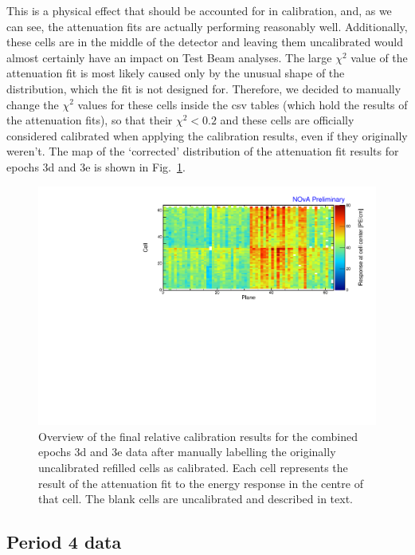 This is a physical effect that should be accounted for in calibration, and, as we can see, the attenuation fits are actually performing reasonably well. Additionally, these cells are in the middle of the detector and leaving them uncalibrated would almost certainly have an impact on Test Beam analyses. The large $\chi^2$ value of the attenuation fit is most likely caused only by the unusual shape of the distribution, which the fit is not designed for. Therefore, we decided to manually change the $\chi^2$ values for these cells inside the csv tables (which hold the results of the attenuation fits), so that their $\chi^2<0.2$ and these cells are officially considered calibrated when applying the calibration results, even if they originally weren't. The map of the `corrected' distribution of the attenuation fit results for epochs 3d and 3e is shown in Fig.~\ref{fig:CellCentreResponseEp3de_updated}.

\begin{figure}[!hbtp]
\centering
\includegraphics[width=\textwidth]{Plots/TBCalibration/CellResponseAtCentre_epoch3de_Limited_NOvAPlotStyle.pdf}
\caption[Corrected map of fitted response at cell centre for epochs 3d and 3e data]{Overview of the final relative calibration results for the combined epochs 3d and 3e data after manually labelling the originally uncalibrated refilled cells as calibrated. Each cell represents the result of the attenuation fit to the energy response in the centre of that cell. The blank cells are uncalibrated and described in text.}
\label{fig:CellCentreResponseEp3de_updated}
\end{figure}

\subsection{Period 4 data}\label{sec:TBPeriod4}

